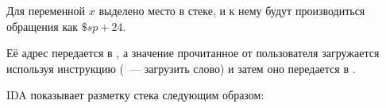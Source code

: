 
Для переменной $x$ выделено место в стеке, и к нему будут производиться обращения как $\$sp+24$.

Её адрес передается в \scanf, а значение прочитанное от пользователя загружается используя 
инструкцию  (~--- загрузить слово) и затем оно передается в \printf.



IDA показывает разметку стека следующим образом:



